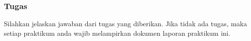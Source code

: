 \par
\subsubsection{Tugas}

Silahkan jelaskan jawaban dari tugas yang diberikan. Jika tidak ada tugas, maka
setiap praktikum anda wajib melampirkan dokumen laporan praktikum ini.
\par